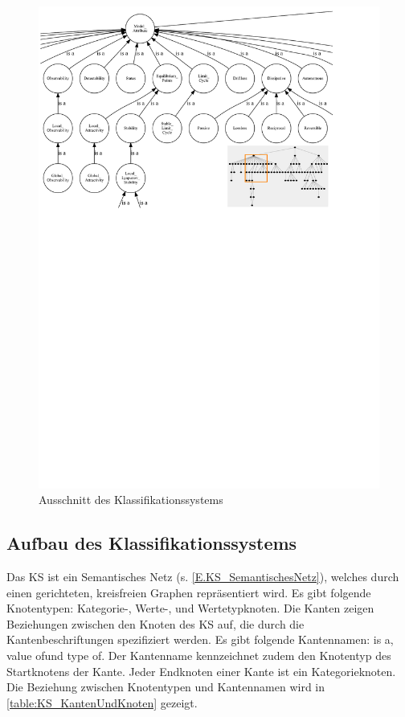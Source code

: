 \begin{figure}[bh]
	\centering
	\includegraphics[trim=0 680.7 109.5 0, clip, width=0.9\linewidth]{KS_Snippet}
	\caption{Ausschnitt des Klassifikationssystems}
	\label{fig:KS_Snippet}
\end{figure}

\subsection{Aufbau des Klassifikationssystems}
\label{Ch:Ergebniss:Sec:KS:SubSec:Aufbau}
Das KS ist ein Semantisches Netz (s. \autoref{E.KS_SemantischesNetz}), welches durch einen gerichteten, kreisfreien Graphen repräsentiert wird. Es gibt folgende Knotentypen: Kategorie-, Werte-, und Wertetypknoten. 
Die Kanten zeigen Beziehungen zwischen den Knoten des KS auf, die durch die Kantenbeschriftungen spezifiziert werden. Es gibt folgende Kantennamen: \glqq is a\grqq, \glqq value of\grqq und \glqq type of\grqq. Der Kantenname kennzeichnet zudem den Knotentyp des Startknotens der Kante. Jeder Endknoten einer Kante ist ein Kategorieknoten. Die Beziehung zwischen Knotentypen und Kantennamen wird in \autoref{table:KS_KantenUndKnoten} gezeigt.

